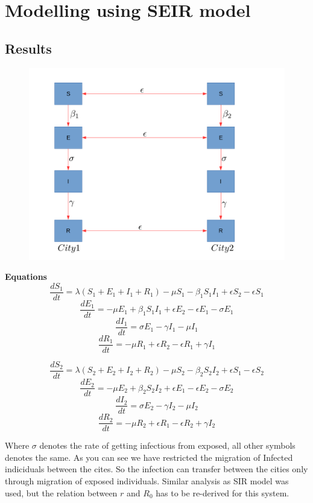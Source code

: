 \documentclass{article}
\begin{document}
\section{Modelling using SEIR model}
\subsection{Results}
\begin{figure}[H]
  \centering
\includegraphics[scale=0.25]{seir_im}
\end{figure}
\textbf{Equations} \newline
$$\frac{dS_{1}}{dt}=\lambda(S_{1}+E_{1}+I_{1}+R_{1}) -\mu  S_{1} - \beta_{1} S_{1}I_{1}  + \epsilon S_{2} -\epsilon S_{1} $$
$$\frac{dE_{1}}{dt}= -\mu  E_{1} + \beta_{1} S_{1}I_{1}  + \epsilon E_{2} -\epsilon E_{1} -\sigma  E_{1} $$
$$\frac{dI_{1}}{dt}= \sigma E_{1} -\gamma I_{1} -\mu I_{1}$$
$$\frac{dR_{1}}{dt}= -\mu  R_{1} +  \epsilon R_{2} -\epsilon R_{1} +\gamma I_{1} $$

$$\frac{dS_{2}}{dt}=\lambda(S_{2}+E_{2}+I_{2}+R_{2}) -\mu  S_{2} - \beta_{2} S_{2}I_{2}  + \epsilon S_{1} -\epsilon S_{2} $$
$$\frac{dE_{2}}{dt}= -\mu  E_{2} + \beta_{2} S_{2}I_{2}  + \epsilon E_{1} -\epsilon E_{2} -\sigma  E_{2} $$
$$\frac{dI_{2}}{dt}= \sigma E_{2} -\gamma I_{2} -\mu I_{2}$$
$$\frac{dR_{2}}{dt}= -\mu  R_{2} +  \epsilon R_{1} -\epsilon R_{2} +\gamma I_{2} $$

Where $\sigma$ denotes the rate of getting infectious from exposed,
all other symbols denotes the same. As you can see we have restricted
the migration of Infected indiciduals between the cites. So the
infection can transfer between the cities only through migration of
exposed individuals. \newline Similar analysis as SIR model was used,
but the relation between $r$ and $R_{0}$ has to be re-derived for this
system.
\end{document}

